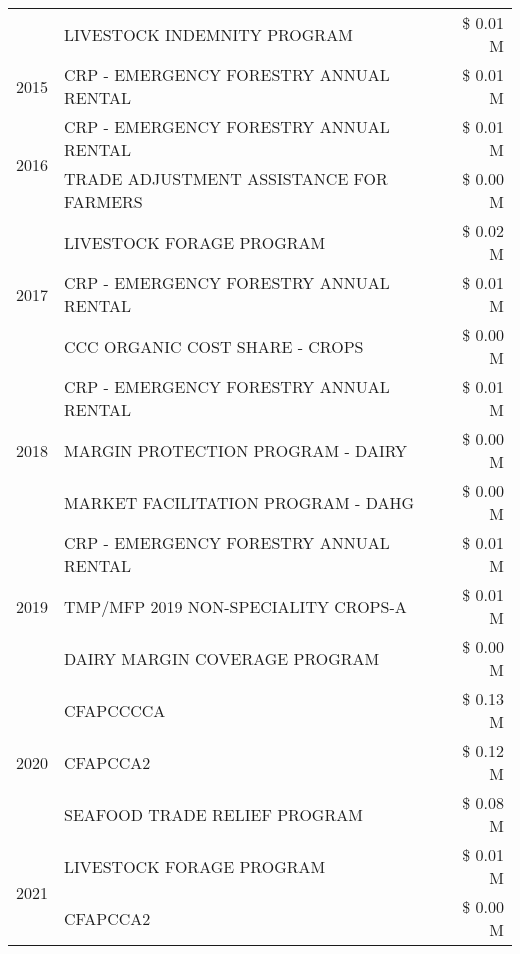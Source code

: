 \begin{tabular}{llr}
 & LIVESTOCK INDEMNITY PROGRAM & \$ 0.01 M \\
\cline{1-3}
2015 & CRP - EMERGENCY FORESTRY ANNUAL RENTAL & \$ 0.01 M \\
\cline{1-3}
\multirow[t]{2}{*}{2016} & CRP - EMERGENCY FORESTRY ANNUAL RENTAL & \$ 0.01 M \\
 & TRADE ADJUSTMENT ASSISTANCE FOR FARMERS & \$ 0.00 M \\
\cline{1-3}
\multirow[t]{3}{*}{2017} & LIVESTOCK FORAGE PROGRAM & \$ 0.02 M \\
 & CRP - EMERGENCY FORESTRY ANNUAL RENTAL & \$ 0.01 M \\
 & CCC ORGANIC COST SHARE - CROPS & \$ 0.00 M \\
\cline{1-3}
\multirow[t]{3}{*}{2018} & CRP - EMERGENCY FORESTRY ANNUAL RENTAL & \$ 0.01 M \\
 & MARGIN PROTECTION PROGRAM - DAIRY & \$ 0.00 M \\
 & MARKET FACILITATION PROGRAM - DAHG & \$ 0.00 M \\
\cline{1-3}
\multirow[t]{3}{*}{2019} & CRP - EMERGENCY FORESTRY ANNUAL RENTAL & \$ 0.01 M \\
 & TMP/MFP 2019 NON-SPECIALITY CROPS-A & \$ 0.01 M \\
 & DAIRY MARGIN COVERAGE PROGRAM & \$ 0.00 M \\
\cline{1-3}
\multirow[t]{3}{*}{2020} & CFAPCCCCA & \$ 0.13 M \\
 & CFAPCCA2 & \$ 0.12 M \\
 & SEAFOOD TRADE RELIEF PROGRAM & \$ 0.08 M \\
\cline{1-3}
\multirow[t]{2}{*}{2021} & LIVESTOCK FORAGE PROGRAM & \$ 0.01 M \\
 & CFAPCCA2 & \$ 0.00 M \\
\cline{1-3}
\bottomrule
\end{tabular}
